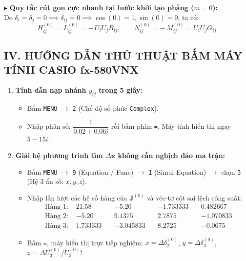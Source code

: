 \documentclass[10.5pt,a4paper]{article}
\begin{document}
\noindent $\blacktriangleright$ \textbf{Quy tắc rút gọn cực nhanh tại bước khởi tạo phẳng ($m=0$):}\\
Do $\delta_i = \delta_j = 0 \implies \delta_{ij} = 0 \implies \cos(0) = 1, \sin(0) = 0$, ta có:
$$H_{ij}^{(0)} = L_{ij}^{(0)} = -\, U_i U_j B_{ij}, \qquad N_{ij}^{(0)} = -\, M_{ij}^{(0)} = U_i U_j G_{ij}$$

\vspace{-4pt}
\subsection*{IV. HƯỚNG DẪN THỦ THUẬT BẤM MÁY TÍNH CASIO fx-580VNX}
\vspace{-4pt}
\begin{enumerate}\setlength{\itemsep}{2pt}\setlength{\parskip}{0pt}
    \item \textbf{Tính dẫn nạp nhánh $y_{ij}$ trong 5 giây:}
    \begin{itemize}\setlength{\itemsep}{0pt}
        \item Bấm \texttt{MENU} $\to$ \texttt{2} (Chế độ số phức \texttt{Complex}).
        \item Nhập phân số: $\dfrac{1}{0.02 + 0.06 i}$ rồi bấm phím \texttt{=}. Máy tính hiển thị ngay $5 - 15i$.
    \end{itemize}
    \item \textbf{Giải hệ phương trình tìm $\Delta \mathbf{x}$ không cần nghịch đảo ma trận:}
    \begin{itemize}\setlength{\itemsep}{0pt}
        \item Bấm \texttt{MENU} $\to$ \texttt{9} (Equation / Func) $\to$ \texttt{1} (Simul Equation) $\to$ chọn \texttt{3} (Hệ 3 ẩn số: $x, y, z$).
        \item Nhập lần lượt các hệ số hàng của $\mathbf{J}^{(0)}$ và véc-tơ cột sai lệch công suất:
        $$\begin{aligned}
        \text{Hàng 1: } & 21.58 \quad & -5.20 \quad & -1.733333 \quad & 0.482667 \\
        \text{Hàng 2: } & -5.20 \quad & 9.1375 \quad & 2.7875 \quad & -1.070833 \\
        \text{Hàng 3: } & 1.733333 \quad & -3.045833 \quad & 8.2725 \quad & -0.0675
        \end{aligned}$$
        \item Bấm \texttt{=}, máy hiển thị trực tiếp nghiệm: $x = \Delta \delta_2^{(0)}$, $y = \Delta \delta_3^{(0)}$, $z = \Delta U_3^{(0)} / U_3^{(0)}$!
    \end{itemize}
\end{enumerate}
\end{document}
